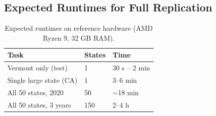 \subsection*{Expected Runtimes for Full Replication}

\begin{table}[h]
\centering
\caption{Expected runtimes on reference hardware (AMD Ryzen 9, 32 GB RAM).}
\label{tab:runtimes}
\begin{tabular}{@{}lll@{}}
\toprule
Task & States & Time \\
\midrule
Vermont only (test)        & 1  & 30 s -- 2 min \\
Single large state (CA)    & 1  & 3--6 min \\
All 50 states, 2020        & 50 & $\sim$18 min \\
All 50 states, 3 years     & 150 & 2--4 h \\
\bottomrule
\end{tabular}
\end{table}

